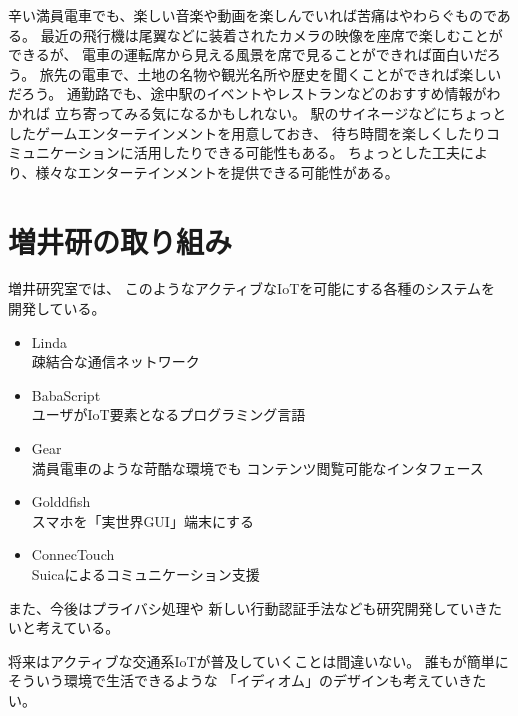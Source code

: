 \documentclass[twocolumn,10pt]{jarticle}
\begin{document}
辛い満員電車でも、楽しい音楽や動画を楽しんでいれば苦痛はやわらぐものである。
最近の飛行機は尾翼などに装着されたカメラの映像を座席で楽しむことができるが、
電車の運転席から見える風景を席で見ることができれば面白いだろう。
旅先の電車で、土地の名物や観光名所や歴史を聞くことができれば楽しいだろう。
%
通勤路でも、途中駅のイベントやレストランなどのおすすめ情報がわかれば
立ち寄ってみる気になるかもしれない。
駅のサイネージなどにちょっとしたゲームエンターテインメントを用意しておき、
待ち時間を楽しくしたりコミュニケーションに活用したりできる可能性もある。
ちょっとした工夫により、様々なエンターテインメントを提供できる可能性がある。


\section{増井研の取り組み}

増井研究室では、
このようなアクティブなIoTを可能にする各種のシステムを
開発している。

\begin{itemize}
  \setlength{\itemsep}{0cm} %
  \item Linda \\
    疎結合な通信ネットワーク
  \item BabaScript \\
    ユーザがIoT要素となるプログラミング言語
  \item Gear \\
    満員電車のような苛酷な環境でも
    コンテンツ閲覧可能なインタフェース
  \item Golddfish \\
    スマホを「実世界GUI」端末にする
  \item ConnecTouch \\
    Suicaによるコミュニケーション支援
\end{itemize}

    

また、今後はプライバシ処理や
新しい行動認証手法なども研究開発していきたいと考えている。

将来はアクティブな交通系IoTが普及していくことは間違いない。
誰もが簡単にそういう環境で生活できるような
「イディオム」のデザインも考えていきたい。


% 
% 
% 
% 
\end{document}
